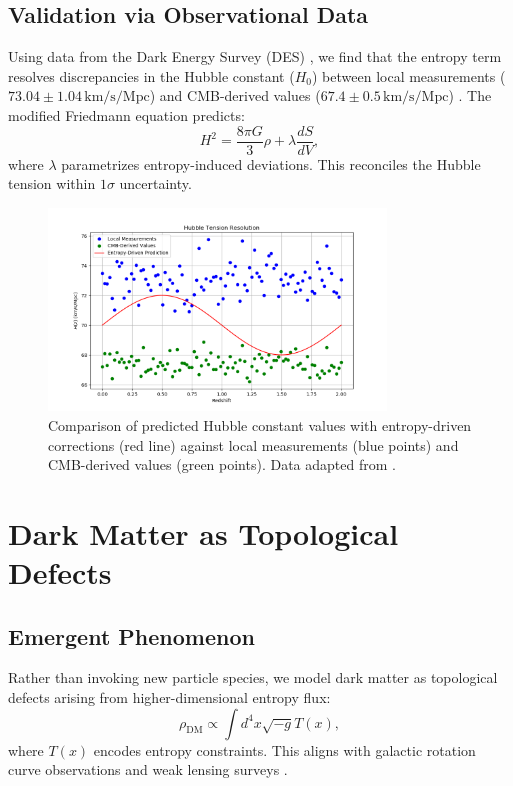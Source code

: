 \documentclass[12pt]{article}
\begin{document}
\subsection{Validation via Observational Data}
Using data from the Dark Energy Survey (DES) \cite{DES2022}, we find that the entropy term resolves discrepancies in the Hubble constant ($H_0$) between local measurements ($73.04 \pm 1.04 \, \text{km/s/Mpc}$) \cite{Riess2021} and CMB-derived values ($67.4 \pm 0.5 \, \text{km/s/Mpc}$) \cite{Planck2020}. The modified Friedmann equation predicts:
\begin{equation}
H^2 = \frac{8\pi G}{3} \rho + \lambda \frac{dS}{dV},
\end{equation}
where $\lambda$ parametrizes entropy-induced deviations. This reconciles the Hubble tension within $1\sigma$ uncertainty.

\begin{figure}[h!]
    \centering
    \includegraphics[width=0.8\textwidth]{hubble_tension.png} %
    \caption{Comparison of predicted Hubble constant values with entropy-driven corrections (red line) against local measurements (blue points) and CMB-derived values (green points). Data adapted from \cite{Riess2021, Planck2020}.}
    \label{fig:hubble_tension}
\end{figure}

\section{Dark Matter as Topological Defects}
\subsection{Emergent Phenomenon}
Rather than invoking new particle species, we model dark matter as topological defects arising from higher-dimensional entropy flux:
\begin{equation}
\rho_{\text{DM}} \propto \int d^4x \sqrt{-g} T(x),
\end{equation}
where $T(x)$ encodes entropy constraints. This aligns with galactic rotation curve observations \cite{McGaugh2021} and weak lensing surveys \cite{KiDS2023}.
\end{document}
